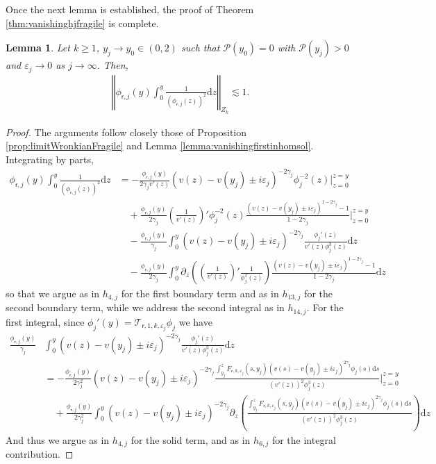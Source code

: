 \documentclass[11pt,reqno]{amsproc}
\newtheorem{lemma}[proposition]{Lemma}
\theoremstyle{definition}
\numberwithin{equation}{section}
\newcommand{\sr}{{\mathsf{r}}}
\newcommand{\cT}{{\mathcal T}}
\renewcommand{\d}{\mathrm{d}}
\newcommand{\ep}{\varepsilon}
\renewcommand{\P}{{\mathcal{P}}}
\begin{document}
Once the next lemma is established, the proof of Theorem \ref{thm:vanishinghjfragile} is complete.

\begin{lemma}\label{lemma:vanishingsecondinhomsol}
Let $k\geq1$, $y_j\rightarrow y_0\in (0,2)$ such that $\P(y_0)=0$ with $\P(y_j)>0$ and $\ep_j\rightarrow 0$ as $j\rightarrow \infty$. Then,
\begin{align*}
\left\Vert  \phi_{\sr,j}(y)\int_0^y \frac{1}{(\phi_{\sr,j}(z))^2} \d z \right\Vert_{Z_k} \lesssim 1.
\end{align*}
\end{lemma}

\begin{proof}
The arguments follow closely those of Proposition \ref{prop:limitWronkianFragile} and Lemma \ref{lemma:vanishingfirstinhomsol}. Integrating by parts,
\begin{align*}
\phi_{\sr,j}(y)\int_0^y \frac{1}{(\phi_{\sr,j}(z))^2} \d z &= -\frac{\phi_{\sr,j}(y)}{2\gamma_j v'(z)}(v(z) - v(y_j) \pm i\ep_j)^{-2\gamma_j}\phi_j^{-2}(z) \Big|_{z=0}^{z=y} \\
&\quad + \frac{\phi_{\sr,j}(y)}{2\gamma_j} \left( \frac{1}{v'(z)} \right)' \phi_{j}^{-2}(z) \frac{(v(z) - v(y_j) \pm i\ep_j)^{1-2\gamma_j}-1}{1-2\gamma_j} \Big|_{z=0}^{z=y} \\
&\quad - \frac{\phi_{\sr,j}(y)}{\gamma_j}\int_0 ^ y (v(z) - v(y_j) \pm i\ep_j)^{-2\gamma_j} \frac{\phi_j'(z) }{v'(z)\phi_j^3(z)} \d z \\
&\quad - \frac{\phi_{\sr,j}(y)}{2\gamma_j}\int_0^y \partial_z \left( \left( \frac{1}{v'(z)} \right)' \frac{1}{\phi_{j}^2(z)} \right) \frac{ (v(z) - v(y_j) \pm i\ep_j)^{1-2\gamma_j}-1}{1-2\gamma_j} \d z
\end{align*}
so that we argue as in $h_{4,j}$ for the first boundary term and as in $h_{13,j}$ for the second boundary term, while we address the second integral as in $h_{14,j}$. For the first integral, since $\phi_j'(y) = \cT_{\sr,1,k,\ep_j}\phi_j$ we have
\begin{align*}
\frac{\phi_{\sr,j}(y)}{\gamma_j}  &\int_0 ^ y (v(z) - v(y_j) \pm i\ep_j)^{-2\gamma_j} \frac{\phi_j'(z) }{v'(z)\phi_j^3(z)} \d z \\
&= -\frac{\phi_{\sr,j}(y)}{2\gamma_j^2} (v(z) - v(y_j) \pm i\ep_j)^{-2\gamma_j} \frac{\int_{y_j}^z F_{\sr,k,\ep_j}(s,y_j)(v(s) - v(y_j) \pm i\ep_j)^{2\gamma_j}\phi_j(s) \d s}{(v'(z))^2 \phi_j^3(z)} \Big|_{z=0}^{z=y} \\
&\quad + \frac{\phi_{\sr,j}(y)}{2\gamma_j^2} \int_0^y (v(z) - v(y_j) \pm i\ep_j)^{-2\gamma_j}  \partial_z \left( \frac{\int_{y_j}^z F_{\sr,k,\ep_j}(s,y_j)(v(s) - v(y_j) \pm i\ep_j)^{2\gamma_j}\phi_j(s) \d s}{(v'(z))^2 \phi_j^3(z)}\right) \d z
\end{align*}
And thus we argue as in $h_{4,j}$ for the solid term, and as in $h_{6,j}$ for the integral contribution.
\end{proof}
\end{document}
